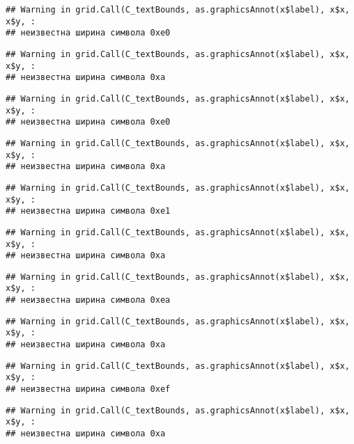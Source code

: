 \documentclass[
]{article}
\begin{document}
\begin{verbatim}
## Warning in grid.Call(C_textBounds, as.graphicsAnnot(x$label), x$x, x$y, :
## неизвестна ширина символа 0xe0
\end{verbatim}

\begin{verbatim}
## Warning in grid.Call(C_textBounds, as.graphicsAnnot(x$label), x$x, x$y, :
## неизвестна ширина символа 0xa
\end{verbatim}

\begin{verbatim}
## Warning in grid.Call(C_textBounds, as.graphicsAnnot(x$label), x$x, x$y, :
## неизвестна ширина символа 0xe0
\end{verbatim}

\begin{verbatim}
## Warning in grid.Call(C_textBounds, as.graphicsAnnot(x$label), x$x, x$y, :
## неизвестна ширина символа 0xa
\end{verbatim}

\begin{verbatim}
## Warning in grid.Call(C_textBounds, as.graphicsAnnot(x$label), x$x, x$y, :
## неизвестна ширина символа 0xe1
\end{verbatim}

\begin{verbatim}
## Warning in grid.Call(C_textBounds, as.graphicsAnnot(x$label), x$x, x$y, :
## неизвестна ширина символа 0xa
\end{verbatim}

\begin{verbatim}
## Warning in grid.Call(C_textBounds, as.graphicsAnnot(x$label), x$x, x$y, :
## неизвестна ширина символа 0xea
\end{verbatim}

\begin{verbatim}
## Warning in grid.Call(C_textBounds, as.graphicsAnnot(x$label), x$x, x$y, :
## неизвестна ширина символа 0xa
\end{verbatim}

\begin{verbatim}
## Warning in grid.Call(C_textBounds, as.graphicsAnnot(x$label), x$x, x$y, :
## неизвестна ширина символа 0xef
\end{verbatim}

\begin{verbatim}
## Warning in grid.Call(C_textBounds, as.graphicsAnnot(x$label), x$x, x$y, :
## неизвестна ширина символа 0xa
\end{verbatim}
\end{document}
